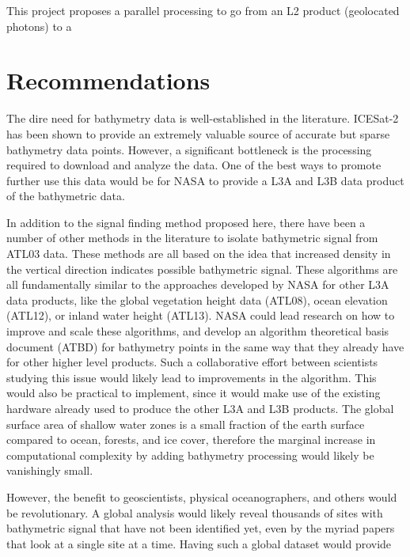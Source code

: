 
This project proposes a parallel processing to go from an L2 product (geolocated photons) to a 

\section{Recommendations}

The dire need for bathymetry data is well-established in the literature. ICESat-2 has been shown to provide an extremely valuable source of accurate but sparse bathymetry data points. However, a significant bottleneck is the processing required to download and analyze the data. One of the best ways to promote further use this data would be for NASA to provide a L3A and L3B data product of the bathymetric data. 

In addition to the signal finding method proposed here, there have been a number of other methods in the literature to isolate bathymetric signal from ATL03 data. These methods are all based on the idea that increased density in the vertical direction indicates possible bathymetric signal. These algorithms are all fundamentally similar to the approaches developed by NASA for other L3A data products, like the global vegetation height data (ATL08), ocean elevation (ATL12), or inland water height (ATL13). NASA could lead research on how to improve and scale these algorithms, and develop an algorithm theoretical basis document (ATBD) for bathymetry points in the same way that they already have for other higher level products. Such a collaborative effort between scientists studying this issue would likely lead to improvements in the algorithm. This would also be practical to implement, since it would make use of the existing hardware already used to produce the other L3A and L3B products. The global surface area of shallow water zones is a small fraction of the earth surface compared to ocean, forests, and ice cover, therefore the marginal increase in computational complexity by adding bathymetry processing would likely be vanishingly small. 

However, the benefit to geoscientists, physical oceanographers, and others would be revolutionary. A global analysis would likely reveal thousands of sites with bathymetric signal that have not been identified yet, even by the myriad papers that look at a single site at a time. Having such a global dataset would provide 